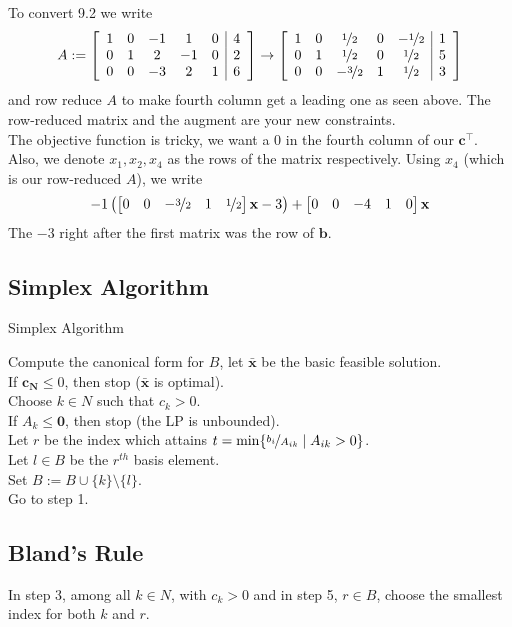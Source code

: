 To convert 9.2 we write
\[A:=
    \left[\begin{array}{ccccc|c}  
        1 & 0 & -1 & 1 & 0 & 4\\
        0 & 1 & 2 & -1 & 0 & 2\\
        0 & 0 & -3 & 2 & 1 & 6
       \end{array}\right]
    \rightarrow
    \left[\begin{array}{ccccc|c}
        1 & 0 & \nicefrac{1}{2} & 0 & -\nicefrac{1}{2} & 1\\
        0 & 1 & \nicefrac{1}{2} & 0 & \nicefrac{1}{2} & 5\\
        0 & 0 & -\nicefrac{3}{2} & 1 & \nicefrac{1}{2} & 3
    \end{array}\right]
\]
and row reduce $A$ to make fourth column get a leading one as seen above.
The row-reduced matrix and the augment are your new constraints.\\
The objective function is tricky, we want a 0 in the fourth column of our $\mathbf{c}^\top $.
Also, we denote $x_1,x_2,x_4$ as the rows of the matrix respectively.
Using $x_4$ (which is our row-reduced $A$), we write
\[-1\left(
    \begin{bmatrix}
        0 & 0 & -\nicefrac{3}{2} & 1 & \nicefrac{1}{2}
    \end{bmatrix}\mathbf{x}-3\right)+
    \begin{bmatrix}
        0 & 0 & -4 & 1 & 0
    \end{bmatrix}\mathbf{x}
\]
The $-3$ right after the first matrix was the row of $\mathbf{b}$.

\subsection{Simplex Algorithm}
\begin{algorithm}
    \caption{Simplex Algorithm}
    Compute the canonical form for $B$, let $\mathbf{\bar{x}}$ be the basic feasible solution.\\
    If $\mathbf{c_N}\le 0$, then stop ($\mathbf{\bar{x}}$ is optimal).\\
    Choose $k\in N$ such that $c_k>0$.\\
    If $A_k\le \mathbf{0}$, then stop (the LP is unbounded).\\
    Let $r$ be the index which attains $t=\min\{\nicefrac{b_i}{A_{ik}}\mid A_{ik}>0\}$.\\
    Let $l\in B$ be the $r^{th}$ basis element.\\
    Set $B:=B\cup\{k\}\setminus\{l\}$.\\
    Go to step 1.
\end{algorithm}

\subsection{Bland's Rule}
In step 3, among all $k\in N$, with $c_k>0$ and in step 5, $r\in B$, 
choose the smallest index for both $k$ and $r$.

